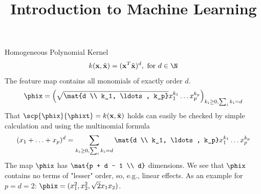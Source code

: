\documentclass[11pt,compress,t,notes=noshow, xcolor=table]{beamer}
\title{Introduction to Machine Learning}
\date{}
\begin{document}



\begin{vbframe}{Homogeneous Polynomial Kernel}
$$ k(\xv, \xtil) = (\xv^T \xtil)^d, \text{ for } d \in \N$$
The feature map contains all monomials of exactly order $d$.
  $$\phix = \left( \sqrt{\mat{d \\ k_1, \ldots, k_p}} x_1^{k_1} \ldots x_p^{k_p}\right)_{k_i \geq 0, \sum_i k_i = d}$$
That $\scp{\phix}{\phixt} = k(\xv, \xtil)$ holds can easily be checked by simple calculation
and using the multinomial formula
$$ (x_1 + \ldots + x_p)^d = \sum_{k_i \geq 0, \sum_i k_i = d} \mat{d \\ k_1, \ldots, k_p} x_1^{k_1} \ldots x_p^{k_p}$$
The map $\phix$ has $\mat{p + d - 1 \\ d}$ dimensions.
We see that $\phix$ contains no terms of "lesser" order, so, e.g., linear effects.
As an example for $p=d=2$: $\phix = (x_1^2, x_2^2, \sqrt{2} x_1 x_2)$.
\end{vbframe}
\end{document}

